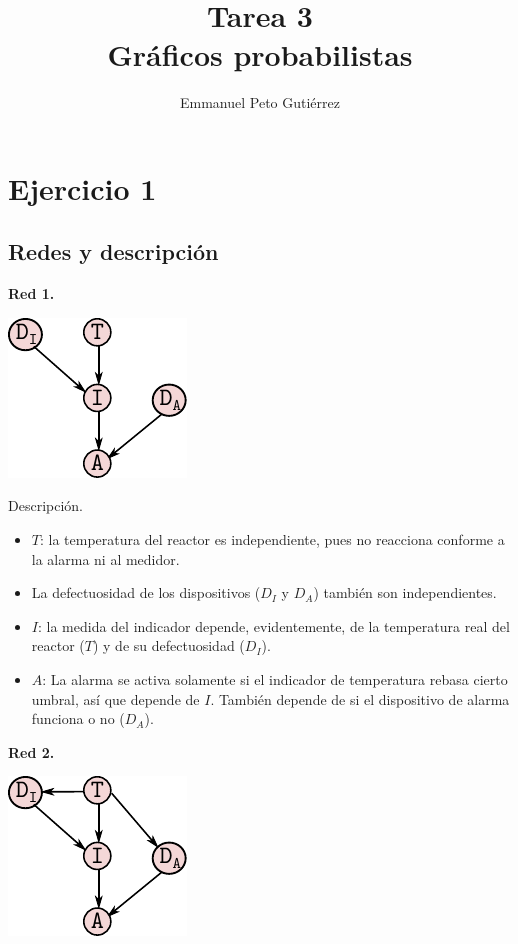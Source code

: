 \documentclass{article}
\title{Tarea 3\\Gráficos probabilistas}
\author{Emmanuel Peto Gutiérrez}
\begin{document}
\maketitle

\section{Ejercicio 1}

\subsection{Redes y descripción}

\textbf{Red 1.}

\begin{center}
\includegraphics[scale=1]{ej1_red1}
\end{center}

Descripción.

\begin{itemize}
\item $T$: la temperatura del reactor es independiente, pues no reacciona conforme a la alarma ni al medidor.
\item La defectuosidad de los dispositivos ($D_I$ y $D_A$) también son independientes.
\item $I$: la medida del indicador depende, evidentemente, de la temperatura real del reactor ($T$) y de su defectuosidad ($D_I$).
\item $A$: La alarma se activa solamente si el indicador de temperatura rebasa cierto umbral, así que depende de $I$. También depende de si el dispositivo de alarma funciona o no ($D_A$).
\end{itemize}

\textbf{Red 2.}

\begin{center}
\includegraphics[scale=1]{ej1_red2}
\end{center}
\end{document}
